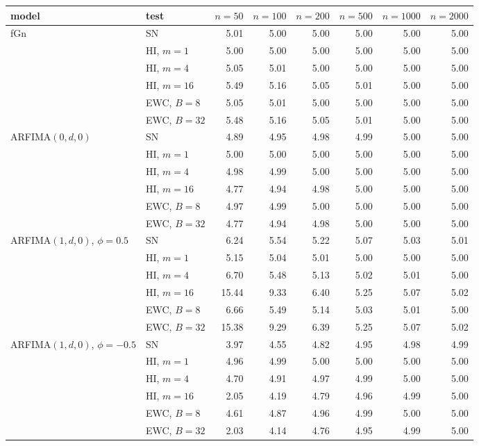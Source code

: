 \begin{tabular}{@{}llrrrrrr@{}}\toprule
model & test & $n=50$ & $n=100$ & $n=200$ & $n=500$ & $n=1000$ & $n=2000$\\\midrule
\multirow{6}{*}{fGn} & SN & 5.01 & 5.00 & 5.00 & 5.00 & 5.00 & 5.00\\
 & HI, $m=1$ & 5.00 & 5.00 & 5.00 & 5.00 & 5.00 & 5.00\\
 & HI, $m=4$ & 5.05 & 5.01 & 5.00 & 5.00 & 5.00 & 5.00\\
 & HI, $m=16$ & 5.49 & 5.16 & 5.05 & 5.01 & 5.00 & 5.00\\
 & EWC, $B=8$ & 5.05 & 5.01 & 5.00 & 5.00 & 5.00 & 5.00\\
 & EWC, $B=32$ & 5.48 & 5.16 & 5.05 & 5.01 & 5.00 & 5.00\\
\midrule
\multirow{6}{*}{ARFIMA$(0,d,0)$} & SN & 4.89 & 4.95 & 4.98 & 4.99 & 5.00 & 5.00\\
 & HI, $m=1$ & 5.00 & 5.00 & 5.00 & 5.00 & 5.00 & 5.00\\
 & HI, $m=4$ & 4.98 & 4.99 & 5.00 & 5.00 & 5.00 & 5.00\\
 & HI, $m=16$ & 4.77 & 4.94 & 4.98 & 5.00 & 5.00 & 5.00\\
 & EWC, $B=8$ & 4.97 & 4.99 & 5.00 & 5.00 & 5.00 & 5.00\\
 & EWC, $B=32$ & 4.77 & 4.94 & 4.98 & 5.00 & 5.00 & 5.00\\
\midrule
\multirow{6}{*}{ARFIMA$(1,d,0)$, $\phi=0.5$} & SN & 6.24 & 5.54 & 5.22 & 5.07 & 5.03 & 5.01\\
 & HI, $m=1$ & 5.15 & 5.04 & 5.01 & 5.00 & 5.00 & 5.00\\
 & HI, $m=4$ & 6.70 & 5.48 & 5.13 & 5.02 & 5.01 & 5.00\\
 & HI, $m=16$ & 15.44 & 9.33 & 6.40 & 5.25 & 5.07 & 5.02\\
 & EWC, $B=8$ & 6.66 & 5.49 & 5.14 & 5.03 & 5.01 & 5.00\\
 & EWC, $B=32$ & 15.38 & 9.29 & 6.39 & 5.25 & 5.07 & 5.02\\
\midrule
\multirow{6}{*}{ARFIMA$(1,d,0)$, $\phi=-0.5$} & SN & 3.97 & 4.55 & 4.82 & 4.95 & 4.98 & 4.99\\
 & HI, $m=1$ & 4.96 & 4.99 & 5.00 & 5.00 & 5.00 & 5.00\\
 & HI, $m=4$ & 4.70 & 4.91 & 4.97 & 4.99 & 5.00 & 5.00\\
 & HI, $m=16$ & 2.05 & 4.19 & 4.79 & 4.96 & 4.99 & 5.00\\
 & EWC, $B=8$ & 4.61 & 4.87 & 4.96 & 4.99 & 5.00 & 5.00\\
 & EWC, $B=32$ & 2.03 & 4.14 & 4.76 & 4.95 & 4.99 & 5.00\\

\bottomrule\end{tabular}
